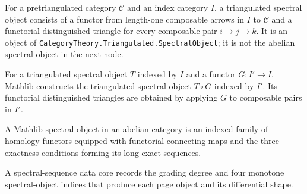 \begin{definition}
  \label{def:mathlib-triangulated-spectral-object}
  \mathlibok
  For a pretriangulated category $\mathcal C$ and an index category $I$, a
  triangulated spectral object consists of a functor from length-one composable
  arrows in $I$ to $\mathcal C$ and a functorial distinguished triangle for
  every composable pair $i\to j\to k$.  It is an object of
  \texttt{CategoryTheory.Triangulated.SpectralObject}; it is not the abelian
  spectral object in the next node.
\end{definition}

\begin{definition}
  \label{def:mathlib-triangulated-spectral-object-precomp}
  \mathlibok
  For a triangulated spectral object $T$ indexed by $I$ and a functor
  $G:I'\to I$, Mathlib constructs the triangulated spectral object
  $T\circ G$ indexed by $I'$.  Its functorial distinguished triangles are
  obtained by applying $G$ to composable pairs in $I'$.
\end{definition}

\begin{definition}
  \label{def:mathlib-spectral-object}
  \mathlibok
  A Mathlib spectral object in an abelian category is an indexed family of
  homology functors equipped with functorial connecting maps and the three
  exactness conditions forming its long exact sequences.
\end{definition}

\begin{definition}
  \label{def:mathlib-spectral-sequence-data-core}
  \mathlibok
  A spectral-sequence data core records the grading degree and four monotone
  spectral-object indices that produce each page object and its differential
  shape.
\end{definition}

